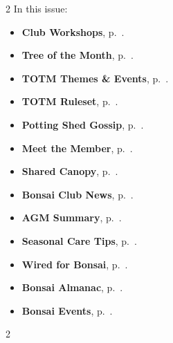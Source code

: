 \setlength{\columnsep}{-5.0cm}
\begin{multicols}{2}
    \noindent\textsf{In this issue:}
    \begin{itemize}
        \item \textsf{\textbf{Club Workshops}}, p.~\pageref{2025-11-workshop}.
        \item \textsf{\textbf{Tree of the Month}}, p.~\pageref{2025-11-contest}.
        \item \textsf{\textbf{TOTM Themes \& Events}}, p.~\pageref{2025-11-themes}.
        \item \textsf{\textbf{TOTM Ruleset}}, p.~\pageref{2025-11-rules}.
        \item \textsf{\textbf{Potting Shed Gossip}}, p.~\pageref{2025-11-gossip}.
        \item \textsf{\textbf{Meet the Member}}, p.~\pageref{2025-11-roots}.
        \item \textsf{\textbf{Shared Canopy}}, p.~\pageref{2025-11-canopy}.
        \item \textsf{\textbf{Bonsai Club News}}, p.~\pageref{2025-11-news}.
        \item \textsf{\textbf{AGM Summary}}, p.~\pageref{2025-11-agm-summary}.
        \item \textsf{\textbf{Seasonal Care Tips}}, p.~\pageref{2025-11-care}.
        \item \textsf{\textbf{Wired for Bonsai}}, p.~\pageref{2025-11-wired}.
        \item \textsf{\textbf{Bonsai Almanac}}, p.~\pageref{2025-11-almanac}.
        \item \textsf{\textbf{Bonsai Events}}, p.~\pageref{2025-11-events}.
    \end{itemize}
    \vfill\null
    \columnbreak

    
\end{multicols}
\pagebreak

\setlength{\columnsep}{0.5cm}
\begin{multicols}{2}
    
    
    
    
    
    
    
    
    
    
    
    
    
\end{multicols}

